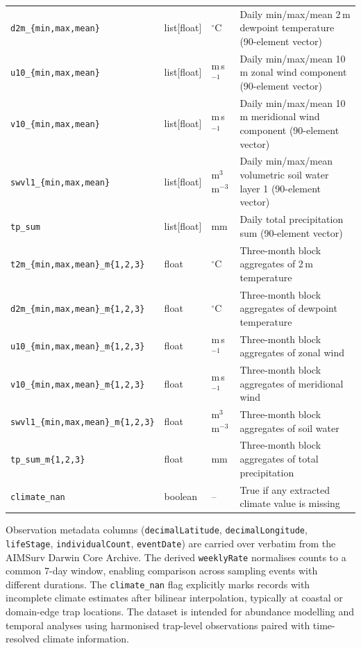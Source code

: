 \documentclass[11pt]{article}
\begin{document}
\begin{table}[htbp]
\begin{tabular}{p{5.5cm}p{2.0cm}p{2.2cm}p{4.6cm}}
\texttt{d2m\_\{min,max,mean\}} & list[float] & $^{\circ}$C & 
  Daily min/max/mean 2\,m dewpoint temperature (90-element vector) \\
\texttt{u10\_\{min,max,mean\}} & list[float] & m\,s$^{-1}$ & 
  Daily min/max/mean 10\,m zonal wind component (90-element vector) \\
\texttt{v10\_\{min,max,mean\}} & list[float] & m\,s$^{-1}$ & 
  Daily min/max/mean 10\,m meridional wind component (90-element vector) \\
\texttt{swvl1\_\{min,max,mean\}} & list[float] & m$^{3}$\,m$^{-3}$ & 
  Daily min/max/mean volumetric soil water layer 1 (90-element vector) \\
\texttt{tp\_sum} & list[float] & mm & 
  Daily total precipitation sum (90-element vector) \\
\texttt{t2m\_\{min,max,mean\}\_m\{1,2,3\}} & float & $^{\circ}$C & 
  Three-month block aggregates of 2\,m temperature \\
\texttt{d2m\_\{min,max,mean\}\_m\{1,2,3\}} & float & $^{\circ}$C & 
  Three-month block aggregates of dewpoint temperature \\
\texttt{u10\_\{min,max,mean\}\_m\{1,2,3\}} & float & m\,s$^{-1}$ & 
  Three-month block aggregates of zonal wind \\
\texttt{v10\_\{min,max,mean\}\_m\{1,2,3\}} & float & m\,s$^{-1}$ & 
  Three-month block aggregates of meridional wind \\
\texttt{swvl1\_\{min,max,mean\}\_m\{1,2,3\}} & float & m$^{3}$\,m$^{-3}$ & 
  Three-month block aggregates of soil water \\
\texttt{tp\_sum\_m\{1,2,3\}} & float & mm & 
  Three-month block aggregates of total precipitation \\
\texttt{climate\_nan} & boolean & -- & 
  True if any extracted climate value is missing \\
\hline
\end{tabular}
\end{table}
Observation metadata columns (\texttt{decimalLatitude}, 
\texttt{decimalLongitude}, \texttt{lifeStage}, \texttt{individualCount}, 
\texttt{eventDate}) are carried over verbatim from the AIMSurv Darwin 
Core Archive. The derived \texttt{weeklyRate} normalises counts to a 
common 7-day window, enabling comparison across sampling events with 
different durations. The \texttt{climate\_nan} flag explicitly marks 
records with incomplete climate estimates after bilinear interpolation, 
typically at coastal or domain-edge trap locations. The dataset 
is intended for abundance modelling and temporal analyses using harmonised 
trap-level observations paired with time-resolved climate information.
\end{document}
